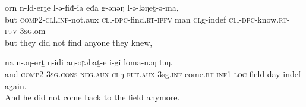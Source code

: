 %
%
%

%
%

\ea \gll orn n-ld-erṯe l-ǝ-fiđ-ia eđa g-ǝnǝŋ l-ǝ-lǝŋeṯ-ǝ-ma,\\
but \textsc{comp}2-\textsc{cl}l.\textsc{inf}-not.aux \textsc{cl}l-\textsc{dpc}-find.\textsc{rt}-\textsc{ipfv} man \textsc{cl}g-indef \textsc{cl}l-\textsc{dpc}-know.\textsc{rt}-\textsc{pfv}-3\textsc{sg}.om\\
\glt but they did not find anyone they knew,
\z 
%

\ea \gll  na n-ǝŋ-erṯ ŋ-iđi aŋ-oɽǝbaṯ-e i-gi loma-nǝŋ tǝŋ.\\
and \textsc{comp}2-3\textsc{sg}.\textsc{cons}-\textsc{neg.aux} \textsc{cl}ŋ-\textsc{fut.aux} 3sg.\textsc{inf}-come.\textsc{rt}-\textsc{inf}1 \textsc{loc}-field day-indef again.\\
\glt And he did not come back to the field anymore.
\z 
%

%
%


